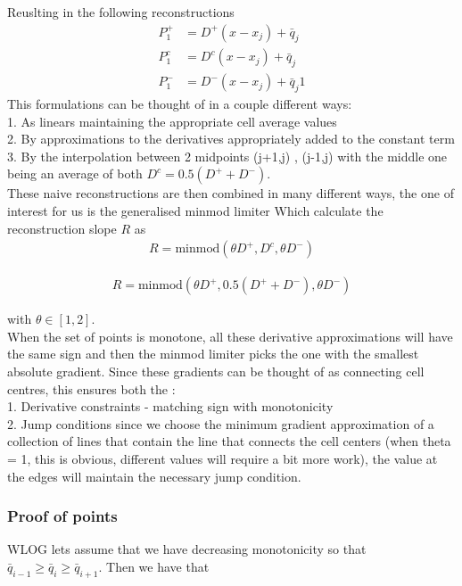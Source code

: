 \documentclass[10pt]{article}
\begin{document}
Reuslting in the following reconstructions
\begin{align}
P_1^+ &= D^+ \left(x - x_j\right) + \bar{q}_{j} \\
P_1^c &= D^c \left(x - x_j\right) + \bar{q}_{j} \\
P_1^- &=D^- \left(x - x_j\right) + \bar{q}_{j}1
\end{align}
This formulations can be thought of in a couple different ways: \\
1. As linears maintaining the appropriate cell average values \\ 
2. By approximations to the derivatives appropriately added to the constant term \\
3. By the interpolation between 2 midpoints (j+1,j) , (j-1,j) with the middle one being an average of both $D^c = 0.5\left(D^+ + D^-\right)$. \\

These naive reconstructions are then combined in many different ways, the one of interest for us is the generalised minmod limiter
Which calculate the reconstruction slope $R$ as
\begin{align}
R = \text{minmod}\left( \theta D^+,D^c,\theta D^-\right)
\end{align}

\begin{align}
R = \text{minmod}\left( \theta D^+,0.5\left(D^+ + D^-\right),\theta D^-\right)
\end{align}

with $\theta \in \left[1,2\right]$. \\

When the set of points is monotone, all these derivative approximations will have the same sign and then the minmod limiter picks the one with the smallest absolute gradient. Since these gradients can be thought of as connecting cell centres, this ensures both the : \\

1. Derivative constraints - matching sign with monotonicity \\
2. Jump conditions since we choose the minimum gradient approximation of a collection of lines that contain the line that connects the cell centers (when theta = 1, this is obvious, different values will require a bit more work), the value at the edges will maintain the necessary jump condition.

\subsubsection{Proof of points }
WLOG lets assume that we have decreasing monotonicity so that $\bar{q}_{i-1} \ge \bar{q}_{i} \ge \bar{q}_{i+1}$. Then we have that
\end{document}
